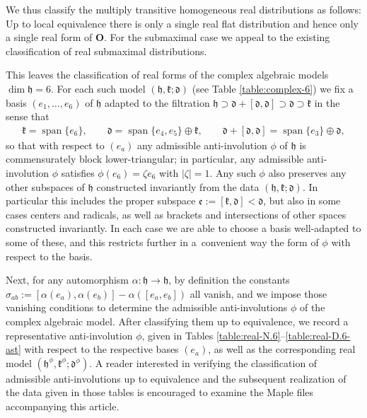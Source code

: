 \documentclass[pdftex]{sigma}
\DeclareMathOperator{\spanOperator}{span}
\newcommand{\Span}[1]{\spanOperator\{{#1}\}}
\newcommand{\mbO}{\mathbf{O}}
\newcommand{\mfd} {\mathfrak{d}}
\newcommand{\mfe} {\mathfrak{e}}
\newcommand{\mfh} {\mathfrak{h}}
\newcommand{\mfk} {\mathfrak{k}}
\numberwithin{equation}{section}
\begin{document}
We thus classify the multiply transitive homogeneous real distributions as follows: Up to local equivalence there is only a single real flat distribution and hence only a single real form of $\mbO$. For the submaximal case we appeal to the existing classification \cite[Theorem 2]{DoubrovZelenko} of real submaximal distributions.

This leaves the classification of real forms of the complex algebraic models $\dim \mfh = 6$. For each such model $(\mfh, \mfk; \mfd)$ (see Table \ref{table:complex-6}) we fix a basis $(e_1, \ldots, e_6)$ of $\mfh$ adapted to the filtration $\mfh \supset \mfd + [\mfd, \mfd] \supset \mfd \supset \mfk$ in the sense that
\begin{gather*}
	\mfk = \Span{e_6}, \qquad
	\mfd = \Span{e_4, e_5} \oplus \mfk, \qquad
	\mfd + [\mfd, \mfd] = \Span{e_3} \oplus \mfd ,
\end{gather*}
so that with respect to $(e_a)$ any admissible anti-involution $\phi$ of $\mfh$ is commensurately block lower-triangular; in particular, any admissible anti-involution $\phi$ satisfies $\phi(e_6) = \zeta e_6$ with $|\zeta| = 1$. Any such $\phi$ also preserves any other subspaces of $\mfh$ constructed invariantly from the data $(\mfh, \mfk; \mfd)$. In particular this includes the proper subspace $\mfe := [\mfk, \mfd] < \mfd$, but also in some cases centers and radicals, as well as brackets and intersections of other spaces constructed invariantly. In each case we are able to choose a basis well-adapted to some of these, and this restricts further in a~convenient way the form of $\phi$ with respect to the basis.

Next, for any automorphism $\alpha\colon \mfh \to \mfh$, by definition the constants $\sigma_{ab} := [\alpha(e_a), \alpha(e_b)] - \alpha([e_a, e_b])$ all vanish, and we impose those vanishing conditions to determine the admissible anti-involutions $\phi$ of the complex algebraic model. After classifying them up to equivalence, we record a representative anti-involution $\phi$, given in Tables \ref{table:real-N.6}--\ref{table:real-D.6-ast} with respect to the respective bases $(e_a)$, as well as the corresponding real model $(\mfh^{\phi}, \mfk^{\phi}; \mfd^{\phi})$. A reader interested in verifying the classification of admissible anti-involutions up to equivalence and the subsequent realization of the data given in those tables is encouraged to examine the Maple files accompanying %
this article.
\end{document}

